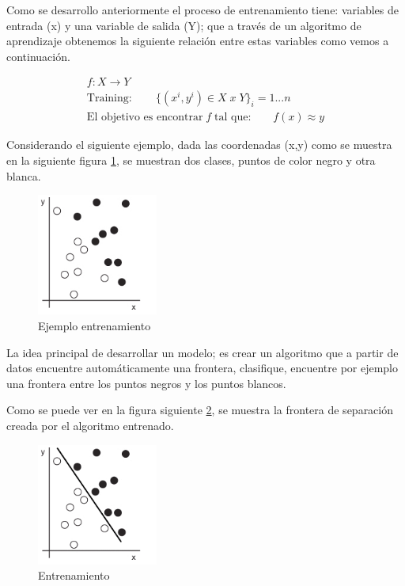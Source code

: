 Como se desarrollo anteriormente el proceso de entrenamiento tiene: variables de entrada (x) y una variable de salida (Y); que a través de un algoritmo de aprendizaje obtenemos la siguiente relación entre estas variables como vemos a continuación.


\begin{eqnarray}
 f:X \longrightarrow Y\\
 \mbox{Training}:\qquad \{(x^i, y^i) \in X\; x\; Y \} _i=1...n\\
 \mbox{El objetivo es encontrar}\; f\; \mbox{tal que:}\qquad f(x)\approx y
\end{eqnarray}

Considerando el siguiente ejemplo, dada las coordenadas (x,y) como se muestra en la siguiente figura \ref{Fig:ejemplo-1}, se muestran dos clases, puntos de color negro y otra blanca.
\begin{figure}[H] \centering
  \includegraphics[height=4cm,keepaspectratio=true,clip=true]{imagenes/MarcoTeorico/sample.png}
  \caption{Ejemplo entrenamiento}\label{Fig:ejemplo-1}
\end{figure}

La idea principal de desarrollar un modelo; es crear un algoritmo que a partir de datos encuentre automáticamente una frontera, clasifique, encuentre por ejemplo una frontera entre los puntos negros y los puntos blancos.

Como se puede ver en la figura siguiente \ref{Fig:ejemplo-2}, se muestra la frontera de separación creada por el algoritmo entrenado.
\begin{figure}[H] \centering
  \includegraphics[height=4cm,keepaspectratio=true,clip=true]{imagenes/MarcoTeorico/sample-fit-1.png}
  \caption{Entrenamiento}\label{Fig:ejemplo-2}
\end{figure}

